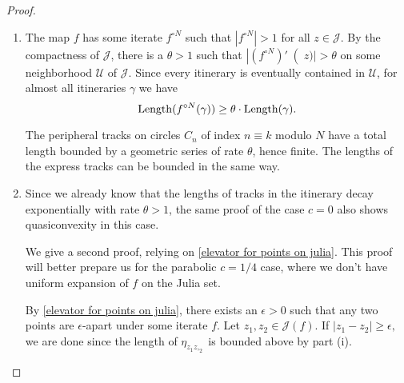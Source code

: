 \begin{proof} \leavevmode
\begin{enumerate}[label=\normalfont(\roman*)]
\item The map $f$ has some iterate $f^{\circ N}$ such that $|f^{\circ N}|>1$ for all $z \in \mathcal{J}$.
By the compactness of $\mathcal J$, there is a $\theta >1$ such that $\left|(f^{\circ N})'\right (z)|>\theta$ on some neighborhood $\mathcal{U}$ of $\mathcal{J}$.
Since every itinerary is eventually contained in $\mathcal{U}$, for almost all itineraries $\gamma$ we have 
\begin{equation*}
\operatorname{Length} ( f^{\circ N}(\gamma) ) \geq \theta \cdot \operatorname{Length}( \gamma). 
\end{equation*}

The peripheral tracks on circles $C_n$ of index $n \equiv k$ modulo $N$ have a total length bounded by a geometric series of rate $\theta$, hence finite. 
The lengths of the express tracks can be bounded in the same way. %

\item Since we already know that the lengths of tracks in the itinerary decay exponentially with rate $\theta>1$, the same proof of the case $c=0$ also shows quasiconvexity in this case.

We give a second proof, relying on \cref{elevator for points on julia}. This proof will better prepare us for the parabolic $c=1/4$ case, where we don't have uniform expansion of $f$ on the Julia set.

By \cref{elevator for points on julia}, there exists an $\epsilon>0$ such that any two points are $\epsilon$-apart under some iterate $f$. 
Let $z_{1},z_{2}\in\mathcal{J}(f)$. If $\left|z_{1}-z_{2}\right|\geq\epsilon,$ we are done since the length of $\eta_{z_1z,_2}$ is bounded above by part (i).

\begin{comment}
Explicitly, if $\Length\left(\eta_{z}\right)\leq L$
for all $z\in\mathcal{J}$ then we take $A\geq\frac{2L}{\epsilon}$
and then automatically $\Length\left(\eta_{z_{1}}+\eta_{z_{2}}\right)\leq A\left|z_{1}-z_{2}\right|$.
\end{comment}


\end{enumerate}
\end{proof}
